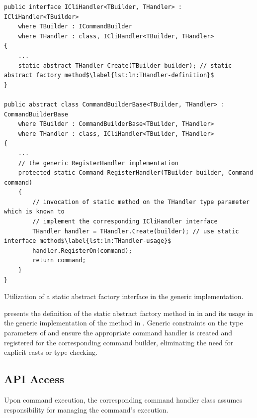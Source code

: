 \begin{listing}[H]
\begin{verbatim}
public interface ICliHandler<TBuilder, THandler> : ICliHandler<TBuilder>
    where TBuilder : ICommandBuilder 
    where THandler : class, ICliHandler<TBuilder, THandler> 
{
    ...
    static abstract THandler Create(TBuilder builder); // static abstract factory method$\label{lst:ln:THandler-definition}$
}

public abstract class CommandBuilderBase<TBuilder, THandler> : CommandBuilderBase
    where TBuilder : CommandBuilderBase<TBuilder, THandler>
    where THandler : class, ICliHandler<TBuilder, THandler>
{
    ...
    // the generic RegisterHandler implementation
    protected static Command RegisterHandler(TBuilder builder, Command command)
    {
        // invocation of static method on the THandler type parameter which is known to 
        // implement the corresponding ICliHandler interface
        THandler handler = THandler.Create(builder); // use static interface method$\label{lst:ln:THandler-usage}$
        handler.RegisterOn(command);
        return command;
    }
}
\end{verbatim}
\caption{Utilization of a static abstract factory interface in the generic  implementation.}
\label{lst:command-builder-static-abstract-interface-members}
\end{listing}

 presents the definition of the static abstract factory method in  in  and its usage in the generic implementation of the  method in . Generic constraints on the type parameters of  and  ensure the appropriate command handler is created and registered for the corresponding command builder, eliminating the need for explicit casts or type checking.

\subsection{API Access}\label{sec:cs-api-access}

Upon command execution, the corresponding command handler class assumes responsibility for managing the command's execution.


